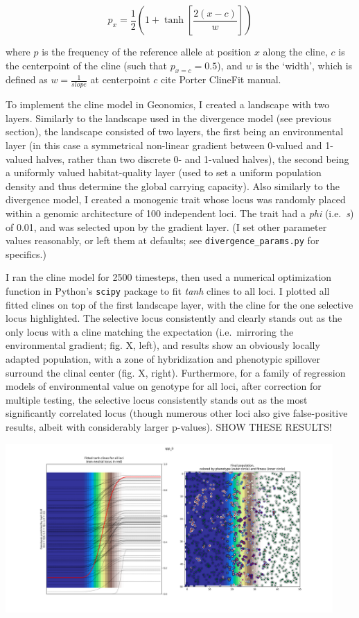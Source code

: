 ﻿\documentclass{article}
\begin{document}
\begin{equation}
p_{x} = \frac{1}{2}(1 + \tanh[\frac{2(x - c)}{w}])
\end{equation}

where $p$ is the frequency of the reference allele at position $x$ along the cline,
$c$ is the centerpoint of the cline (such that $p_{x=c} = 0.5$), and $w$ is the 
`width', which is defined as $w = \frac{1}{slope}$ at centerpoint
$c$ {\large cite Porter ClineFit manual}.

To implement the cline model in Geonomics, I created a landscape with two layers.
Similarly to the landscape used in the divergence model (see previous section), the
landscape consisted of two layers, the first being an environmental layer (in this case a
symmetrical non-linear gradient between 0-valued and 1-valued halves, rather than two
discrete 0- and 1-valued halves), the second being a uniformly valued
habitat-quality layer (used to set a uniform population density and thus determine
the global carrying capacity). Also similarly to the divergence model, I created a
monogenic trait whose locus was randomly placed within a genomic architecture of 
100 independent loci. The trait had a \emph{phi} (i.e.\ \emph{s}) of 0.01,
and was selected upon by the gradient layer.
(I set other parameter values reasonably, or left them
at defaults; see \texttt{divergence\_params.py} for specifics.)

I ran the cline model for 2500 timesteps, then used a numerical optimization
function in Python's \texttt{scipy} package to fit \emph{tanh} clines to all loci.
I plotted all fitted clines on top of the first landscape layer, with the cline
for the one selective locus highlighted.
The selective locus consistently and clearly stands out as the only locus with a cline
matching the expectation (i.e.\ mirroring the environmental gradient; fig. X, left),
and results show an obviously locally adapted population, with a zone of hybridization
and phenotypic spillover surround the clinal center (fig. X, right).
Furthermore, for a family of regression models of environmental value on genotype
for all loci, after correction for multiple testing, the selective locus consistently
stands out as the most significantly correlated locus (though numerous other loci
also give false-positive results, albeit with considerably larger p-values). SHOW
THESE RESULTS!

\includegraphics[width=125mm]{./img/validation/cline/cline_adaptation_phi_0pt01_2500_timesteps.png}
\end{document}
